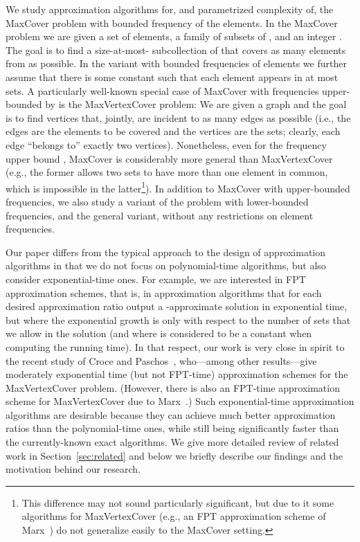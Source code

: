 \documentclass[11pt]{article}
\begin{document}
We study approximation algorithms for, and parametrized complexity of,
the MaxCover problem with bounded frequency of the elements. In the
MaxCover problem we are given a set  of  elements, a family
 of  subsets of , and an integer
. The goal is to find a size-at-most- subcollection of 
that covers as many elements from  as possible. In the variant with
bounded frequencies of elements we further assume that there is some
constant  such that each element appears in at most  sets. A
particularly well-known special case of MaxCover with frequencies
upper-bounded by  is the MaxVertexCover problem: We are given a
graph  and the goal is to find  vertices that, jointly,
are incident to as many edges as possible (i.e., the edges are the
elements to be covered and the vertices are the sets; clearly, each
edge ``belongs to'' exactly two vertices). Nonetheless, even for the
frequency upper bound , MaxCover is considerably more general than
MaxVertexCover (e.g., the former allows two sets to have more than one
element in common, which is impossible in the latter\footnote{This
  difference may not sound particularly significant, but due to it
  some algorithms for MaxVertexCover (e.g., an FPT approximation
  scheme of Marx~\cite{Marx06parameterizedcomplexity}) do not
  generalize easily to the MaxCover setting.}).
In addition to MaxCover with upper-bounded frequencies, we also study
a variant of the problem with lower-bounded frequencies, and the
general variant, without any restrictions on element frequencies.

Our paper differs from the typical approach to the design of
approximation algorithms in that we do not focus on polynomial-time
algorithms, but also consider exponential-time ones.  For example, we
are interested in FPT approximation schemes, that is, in approximation
algorithms that for each desired approximation ratio  output a
-approximate solution in exponential time, but where the
exponential growth is only with respect to the number  of sets that
we allow in the solution (and where  is considered to be a
constant when computing the running time). In that respect, our work
is very close in spirit to the recent study of Croce and
Paschos~\cite{cro-pas:j:cover}, who---among other results---give
moderately exponential time (but not FPT-time) approximation schemes
for the MaxVertexCover problem. (However, there is also an FPT-time
approximation scheme for MaxVertexCover due to
Marx~\cite{Marx06parameterizedcomplexity}.)  Such exponential-time
approximation algorithms are desirable because they can achieve much
better approximation ratios than the polynomial-time ones, while still
being significantly faster than the currently-known exact
algorithms. We give more detailed review of related work in
Section~\ref{sec:related} and below we briefly describe our findings
and the motivation behind our research.
\end{document}
